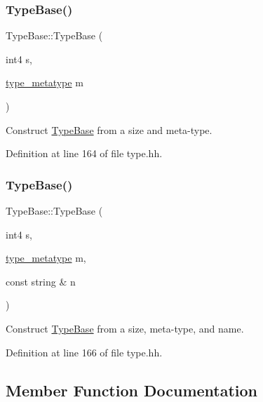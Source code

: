 \subsubsection{\texorpdfstring{TypeBase()}{TypeBase()}\hspace{0.1cm}{\footnotesize\ttfamily [2/3]}}
{\footnotesize\ttfamily Type\+Base\+::\+Type\+Base (\begin{DoxyParamCaption}\item[{int4}]{s,  }\item[{\mbox{\hyperlink{type_8hh_aef6429f2523cdf4d415ba04a0209e61f}{type\+\_\+metatype}}}]{m }\end{DoxyParamCaption})\hspace{0.3cm}{\ttfamily [inline]}}



Construct \mbox{\hyperlink{class_type_base}{Type\+Base}} from a size and meta-\/type. 



Definition at line 164 of file type.\+hh.

\mbox{\label{class_type_base_aa722eb1d566302bedbfe08ba372b7e3c}} 
\subsubsection{\texorpdfstring{TypeBase()}{TypeBase()}\hspace{0.1cm}{\footnotesize\ttfamily [3/3]}}
{\footnotesize\ttfamily Type\+Base\+::\+Type\+Base (\begin{DoxyParamCaption}\item[{int4}]{s,  }\item[{\mbox{\hyperlink{type_8hh_aef6429f2523cdf4d415ba04a0209e61f}{type\+\_\+metatype}}}]{m,  }\item[{const string \&}]{n }\end{DoxyParamCaption})\hspace{0.3cm}{\ttfamily [inline]}}



Construct \mbox{\hyperlink{class_type_base}{Type\+Base}} from a size, meta-\/type, and name. 



Definition at line 166 of file type.\+hh.



\subsection{Member Function Documentation}
\mbox{\label{class_type_base_ad506116cf9bf5bc6d13654b38609d184}} 
